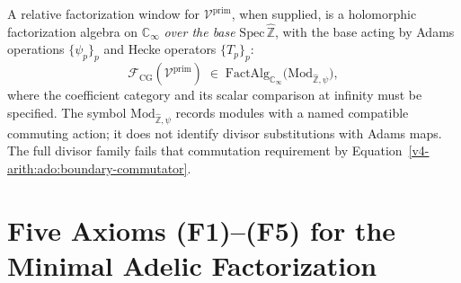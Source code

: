 \begin{definition}
\label{v4-arith:def:relative-adelic-factorization}
A relative factorization window for
\(\mathcal{V}^{\mathrm{prim}}\), when supplied, is a holomorphic
factorization algebra on
\(\mathbb{C}_{\infty}\) \emph{over the base}
\(\mathrm{Spec}\,\widehat{\mathbb{Z}}\), with the base acting by
Adams operations \(\{\psi_{p}\}_{p}\) and Hecke operators
\(\{T_{p}\}_{p}\):
\begin{equation}
\mathcal{F}_{\mathrm{CG}}(\mathcal{V}^{\mathrm{prim}})
\;\in\;\mathrm{FactAlg}_{\mathbb{C}_{\infty}}\bigl(\mathrm{Mod}_{\widehat{\mathbb{Z}},\psi}\bigr),
\end{equation}
where the coefficient category and its scalar comparison at infinity
must be specified. The symbol
\(\mathrm{Mod}_{\widehat{\mathbb Z},\psi}\) records modules with a
named compatible commuting action; it does not identify divisor
substitutions with Adams maps. The full divisor family fails that
commutation requirement by Equation~\ref{v4-arith:ado:boundary-commutator}.
\end{definition}

\section{Five Axioms (F1)--(F5) for the Minimal Adelic Factorization}
\label{v4-arith:cg:five-axioms}

